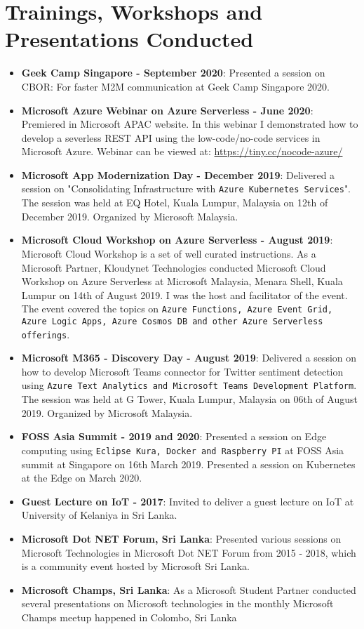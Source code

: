 \documentclass[a4paper,11pt]{article}
\newcommand{\resumeItem}[2]{
  \item\small{
    \textbf{#1}{: #2 \vspace{-2pt}}
  }
}
\newcommand{\resumeSubItem}[2]{\resumeItem{#1}{#2}\vspace{-4pt}}
\newcommand{\resumeSubHeadingListStart}{\begin{itemize}[leftmargin=*]}
\newcommand{\resumeSubHeadingListEnd}{\end{itemize}}
\begin{document}
\section{Trainings, Workshops and Presentations Conducted}
  \resumeSubHeadingListStart
    \resumeSubItem{Geek Camp Singapore - September 2020}
      {Presented a session on CBOR: For faster M2M communication at Geek Camp Singapore 2020.}
    \resumeSubItem{Microsoft Azure Webinar on Azure Serverless - June 2020}
      {Premiered in Microsoft APAC website. In this webinar I demonstrated how to develop a severless REST API using the low-code/no-code services in Microsoft Azure. Webinar can be viewed at: \href{https://tiny.cc/nocode-azure/}{https://tiny.cc/nocode-azure/}}
     \resumeSubItem{Microsoft App Modernization Day - December 2019}
      {Delivered a session on "Consolidating Infrastructure with \texttt{Azure Kubernetes Services}". The session was held at EQ Hotel, Kuala Lumpur, Malaysia on 12th of December 2019. Organized by Microsoft Malaysia.}
    \resumeSubItem{Microsoft Cloud Workshop on Azure Serverless - August 2019}
      {Microsoft Cloud Workshop is a set of well curated instructions. As a Microsoft Partner, Kloudynet Technologies conducted Microsoft Cloud Workshop on Azure Serverless at Microsoft Malaysia, Menara Shell, Kuala Lumpur on 14th of August 2019. I was the host and facilitator of the event. The event covered the topics on \texttt{Azure Functions, Azure Event Grid, Azure Logic Apps, Azure Cosmos DB and other Azure Serverless offerings}.}
    \resumeSubItem{Microsoft M365 - Discovery Day - August 2019}
      {Delivered a session on how to develop Microsoft Teams connector for Twitter sentiment detection using \texttt{Azure Text Analytics and Microsoft Teams Development Platform}. The session was held at G Tower, Kuala Lumpur, Malaysia on 06th of August 2019. Organized by Microsoft Malaysia.}
   \resumeSubItem{FOSS Asia Summit - 2019 and 2020}
      {Presented a session on Edge computing using \texttt{Eclipse Kura, Docker and Raspberry PI} at FOSS Asia summit at Singapore on 16th March 2019. Presented a session on Kubernetes at the Edge on March 2020.}
    \resumeSubItem{Guest Lecture on IoT - 2017}
      {Invited to deliver a guest lecture on IoT at University of Kelaniya in Sri Lanka.}
    \resumeSubItem{Microsoft Dot NET Forum, Sri Lanka}
      {Presented various sessions on Microsoft Technologies in Microsoft Dot NET Forum from 2015 - 2018, which is a community event hosted by Microsoft Sri Lanka.}
    \resumeSubItem{Microsoft Champs, Sri Lanka}
      {As a Microsoft Student Partner conducted several presentations on Microsoft technologies in the monthly Microsoft Champs meetup happened in Colombo, Sri Lanka}
  \resumeSubHeadingListEnd
  
\end{document}
